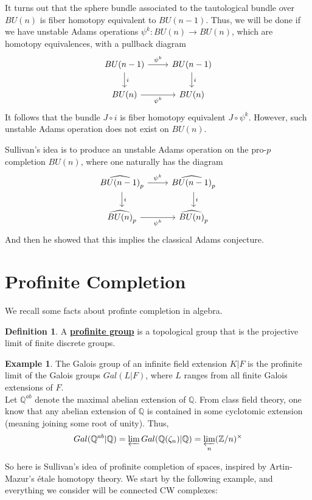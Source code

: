 \documentclass{article}
\theoremstyle{definition}
\theoremstyle{definition}
\newtheorem{definition}{Definition}[theorem]
\theoremstyle{definition}
\theoremstyle{definition}
\theoremstyle{definition}
\theoremstyle{definition}
\theoremstyle{definition}
\newtheorem{example}{Example}[theorem]
\begin{document}
It turns out that the sphere bundle associated to the tautological bundle over $BU(n)$ is fiber homotopy equivalent to $BU(n-1)$. Thus, we will be done if we have unstable Adams operations $\psi^k: BU(n)\to BU(n)$, which are homotopy equivalences, with a pullback diagram
\[\begin{tikzcd}
	{BU(n-1)} & {BU(n-1)} \\
	{BU(n)} & {BU(n)}
	\arrow["{\psi^k}", from=1-1, to=1-2]
	\arrow["i", from=1-1, to=2-1]
	\arrow["i", from=1-2, to=2-2]
	\arrow["{\psi^k}"', from=2-1, to=2-2]
\end{tikzcd}\]
It follows that the bundle $J\circ i$ is fiber homotopy equivalent $J\circ \psi^k$. However, such unstable Adams operation does not exist on $BU(n)$.



Sullivan's idea is to produce an unstable Adams operation on the pro-$p$ completion $BU(n)$, where one naturally has the diagram
\[\begin{tikzcd}
	{\widehat{BU(n-1)}_p} & {\widehat{BU(n-1)}_p} \\
	{\widehat{BU(n)}_p} & {\widehat{BU(n)}_p}
	\arrow["{\psi^k}", from=1-1, to=1-2]
	\arrow["i", from=1-1, to=2-1]
	\arrow["i", from=1-2, to=2-2]
	\arrow["{\psi^k}"', from=2-1, to=2-2]
\end{tikzcd}\]
And then he showed that this implies the classical Adams conjecture. 



\section{Profinite Completion}
We recall some facts about profinte completion in algebra.  
\begin{tcolorbox}[colback=purple!5!white,colframe=purple!75!black]
\begin{definition}
A \underline{\textbf{profinite group}} is a topological group that is the projective limit of finite discrete groups.
\end{definition}
\end{tcolorbox}


\begin{tcolorbox}[colback=yellow!5!white,colframe=yellow!30!white]
\begin{example}
The Galois group of an infinite field extension $K|F$ is the profinite limit of the Galois groups $Gal(L|F)$, where $L$ ranges from all finite Galois extensions of $F$. \\

Let $\mathbb{Q}^{ab}$ denote the maximal abelian extension of $\mathbb{Q}$. From class field theory, one know that any abelian extension of $\mathbb{Q}$ is contained in some cyclotomic extension (meaning joining some root of unity). Thus, 
\[Gal(\mathbb{Q}^{ab}|\mathbb{Q})=\varprojlim Gal(\mathbb{Q}(\zeta_{n})|\mathbb{Q})=\varprojlim_n (\mathbb{Z}/n)^{\times}\]
\end{example}
\end{tcolorbox}
So here is Sullivan's idea of profinite completion of spaces, inspired by Artin-Mazur's 
\'etale homotopy theory. We start by the following example, and everything we consider will be connected CW complexes:
\end{document}
